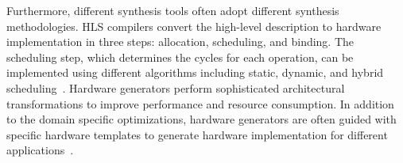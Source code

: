 Furthermore, different synthesis tools often adopt different synthesis methodologies. HLS compilers convert the high-level description to hardware implementation in three steps: allocation, scheduling, and binding. The scheduling step, which determines the cycles for each operation, can be implemented using different algorithms including static, dynamic, and hybrid scheduling~\cite{Dynamatic_Josipovi, cheng_dss}. Hardware generators perform sophisticated architectural transformations to improve performance and resource consumption. In addition to the domain specific optimizations, hardware generators are often guided with specific hardware templates to generate hardware implementation for different applications~\cite{tensorlib, aetherling}. %



